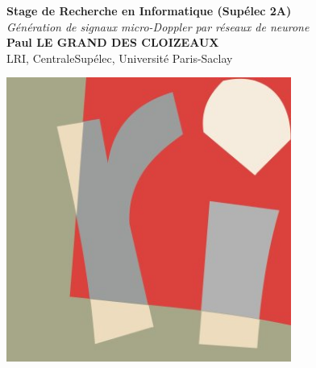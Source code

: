 \documentclass[a0,portrait]{a0poster}
\begin{document}
\large


\begin{minipage}[b]{0.75\linewidth}
\veryHuge \color{NavyBlue} \textbf{Stage de Recherche en Informatique (Sup\'e{}lec 2A)} \color{Black}\\
\Huge\textit{ Génération de signaux micro-Doppler par réseaux de neurone }\\[18mm]
\huge \textbf{Paul LE GRAND DES CLOIZEAUX}\\[0.5cm] 
\huge LRI, CentraleSupélec, Université Paris-Saclay
\end{minipage}
%
\begin{minipage}[b]{0.23\linewidth}
\begin{flushright}
\includegraphics[width=0.7\textwidth]{logo_lri.jpg}
\end{flushright}
\end{minipage}

\vspace{1cm} %

\end{document}
